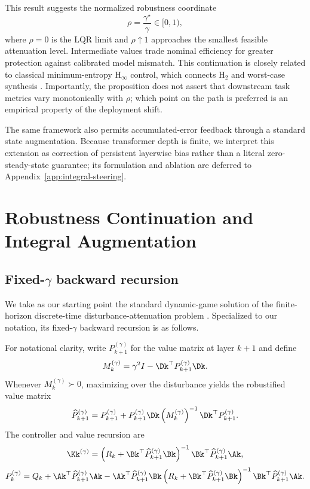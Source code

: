 This result suggests the normalized robustness coordinate
$$
\rho
=
\frac{\gamma^\star}{\gamma}
\in[0,1),
$$
where $\rho=0$ is the LQR limit and $\rho\uparrow1$ approaches the smallest
feasible attenuation level.  Intermediate values trade nominal efficiency for
greater protection against calibrated model mismatch.  This continuation is
closely related to classical minimum-entropy $\mathrm{H}_{\infty}$ control,
which connects $\mathrm{H}_2$ and worst-case synthesis
\citep{doyle1989state,iglesias1990discrete,peters1995connections}.
Importantly, the proposition does
not assert that downstream task metrics vary monotonically with $\rho$; which
point on the path is preferred is an empirical property of the deployment
shift.

The same framework also permits accumulated-error feedback through a standard
state augmentation.  Because transformer depth is finite, we interpret this
extension as correction of persistent layerwise bias rather than a literal
zero-steady-state guarantee; its formulation and ablation are deferred to
Appendix~\ref{app:integral-steering}.



\section{Robustness Continuation and Integral Augmentation}
\label{app:robustness-continuum}

\subsection{Fixed-$\gamma$ backward recursion}

We take as our starting point the standard dynamic-game solution of the
finite-horizon discrete-time disturbance-attenuation problem
\citep{basar1991dynamic,hassibi1999indefinite}. Specialized to our notation,
its fixed-$\gamma$ backward recursion is as follows.

For notational clarity, write $P_{k+1}^{(\gamma)}$ for the value matrix at
layer $k+1$ and define
$$
M_k^{(\gamma)}
=
\gamma^2 I
-
\Dk^\top P_{k+1}^{(\gamma)}\Dk.
$$
Whenever $M_k^{(\gamma)}\succ0$, maximizing over the disturbance yields the
robustified value matrix
$$
\widehat P_{k+1}^{(\gamma)}
=
P_{k+1}^{(\gamma)}
+
P_{k+1}^{(\gamma)}\Dk
\left(M_k^{(\gamma)}\right)^{-1}
\Dk^\top P_{k+1}^{(\gamma)}.
$$
The controller and value recursion are
$$
\Kk^{(\gamma)}
=
\left(
R_k+\Bk^\top\widehat P_{k+1}^{(\gamma)}\Bk
\right)^{-1}
\Bk^\top\widehat P_{k+1}^{(\gamma)}\Ak,
$$
$$
P_k^{(\gamma)}
=
Q_k
+
\Ak^\top\widehat P_{k+1}^{(\gamma)}\Ak
-
\Ak^\top\widehat P_{k+1}^{(\gamma)}\Bk
\left(
R_k+\Bk^\top\widehat P_{k+1}^{(\gamma)}\Bk
\right)^{-1}
\Bk^\top\widehat P_{k+1}^{(\gamma)}\Ak.
$$

